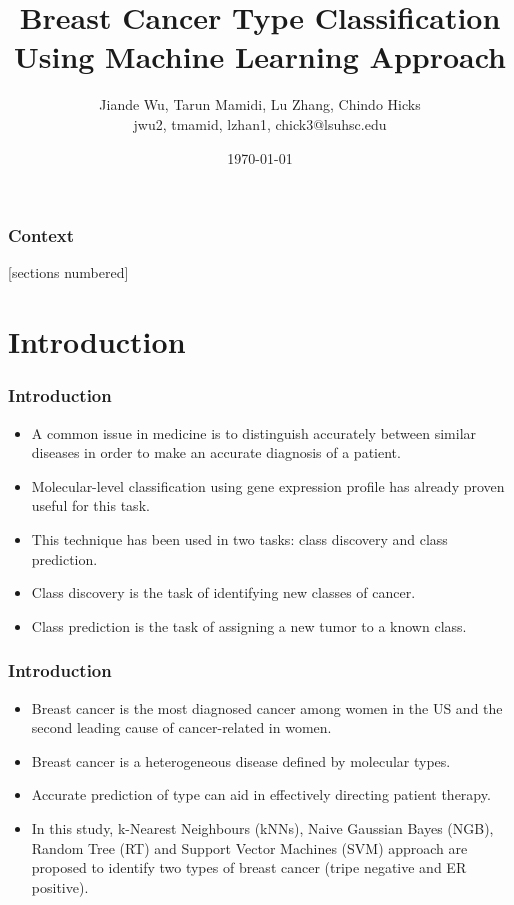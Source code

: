 \documentclass[xcolor=table]{beamer}
\title[Breast cancer --- Machine learning]{Breast Cancer Type Classification Using Machine Learning Approach}
\author[J. Wu, T. Mamidi, L. Zhang, C. Hicks]{\scriptsize{Jiande Wu, Tarun Mamidi, Lu Zhang, Chindo Hicks}\\{\ttfamily jwu2, tmamid, lzhan1, chick3@lsuhsc.edu}}
\institute{Department of Genetics, LSUHSC\\ Bioinformatics and Genomics (BIG) Program}
\date{\today}
\numberwithin{figure}{section}
\numberwithin{equation}{section}
\begin{document}

\begin{frame}[plain,t]
\titlepage
\end{frame}


\begin{frame}
  \addtocounter{framenumber}{-1}
  \frametitle{Context}
  [sections numbered]
  \tableofcontents[hideallsubsections]
\end{frame}


\section{Introduction}
\begin{frame}
 \frametitle{Introduction}
 \begin{itemize}
     \item A common issue in medicine is to distinguish accurately between similar diseases in order to make an accurate diagnosis of a patient. 
     \item Molecular-level classification using gene expression profile has already proven useful for this task.
     \item This technique has been used in two tasks: class discovery and class prediction. 
     \item Class discovery is the task of identifying new classes of cancer.
     \item Class prediction is the task of assigning a new tumor to a known class.
 \end{itemize}
\end{frame}

\begin{frame}
 \frametitle{Introduction}
  \begin{itemize}
    \item Breast cancer is the most diagnosed cancer among women in the US and the second leading cause of cancer-related in women.
    \item Breast cancer is a heterogeneous disease defined by molecular types. 
    \item Accurate prediction of type can aid in effectively directing patient therapy. 
    \item In this study, k-Nearest Neighbours (kNNs), Naive Gaussian Bayes (NGB), Random Tree (RT) and Support Vector Machines (SVM) approach are proposed to identify two types of breast cancer (tripe negative and ER positive).
  \end{itemize}
\end{frame}
\end{document}
